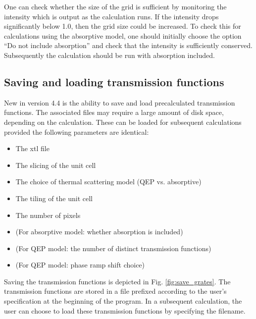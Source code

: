 \documentclass[12pt,a4paper]{article}
\begin{document}
One can check whether the size of the grid is sufficient by monitoring the intensity which is output as the calculation runs.
If the intensity drops significantly below 1.0, then the grid size could be increased.
To check this for calculations using the absorptive model, one should initially choose the option ``Do not include absorption'' and check that the intensity is sufficiently conserved.
Subsequently the calculation should be run with absorption included.


\subsection{Saving and loading transmission functions}

New in version 4.4 is the ability to save and load precalculated transmission functions.
The associated files may require a large amount of disk space, depending on the calculation.
These can be loaded for subsequent calculations provided the following parameters are identical:
%
\begin{itemize}
    \item The xtl file
    \item The slicing of the unit cell
    \item The choice of thermal scattering model (QEP vs. absorptive)
    \item The tiling of the unit cell
    \item The number of pixels
    \item (For absorptive model: whether absorption is included)
    \item (For QEP model: the number of distinct transmission functions)
    \item (For QEP model: phase ramp shift choice)
\end{itemize}
%
Saving the transmission functions is depicted in Fig. \ref{fig:save_grates}.
The transmission functions are stored in a file prefixed according to the user's specification at the beginning of the program.
In a subsequent calculation, the user can choose to load these transmission functions by specifying the filename.
\end{document}
